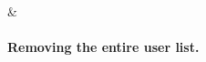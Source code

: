\documentclass{article}
\begin{document}
\begin{table}
\begin{tabularx}{\textwidth}
\begin{itemize}
		\end{itemize} &
		\paragraph{Removing the entire user list.}
		\\
		\hline
	\end{tabularx}
\end{table}
\end{document}
